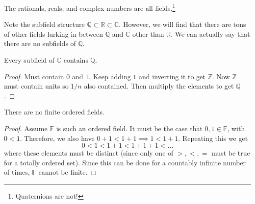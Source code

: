   \begin{example}[Numbers]
    The rationals, reals, and complex numbers are all fields.\footnote{Quaternions are not!}
  \end{example}

  Note the subfield structure $\mathbb{Q} \subset \mathbb{R} \subset \mathbb{C}$. However, we will find that there are tons of other fields lurking in between $\mathbb{Q}$ and $\mathbb{C}$ other than $\mathbb{R}$. We can actually say that there are no subfields of $\mathbb{Q}$. 

  \begin{lemma}
    Every subfield of $\mathbb{C}$ contains $\mathbb{Q}$. 
  \end{lemma}
  \begin{proof}
    Must contain $0$ and $1$. Keep adding $1$ and inverting it to get $\mathbb{Z}$. Now $\mathbb{Z}$ must contain units so $1/n$ also contained. Then multiply the elements to get $\mathbb{Q}$. 
  \end{proof} 

  \begin{theorem}
    There are no finite ordered fields. 
  \end{theorem} 
  \begin{proof}
    Assume $\mathbb{F}$ is such an ordered field. It must be the case that $0, 1 \in \mathbb{F}$, with $0 < 1$. Therefore, we also have $0 + 1 < 1 + 1 \implies 1 < 1 + 1$. Repeating this we get 
    \begin{equation}
      0 < 1 < 1 + 1 < 1 + 1 + 1 < \ldots
    \end{equation}
    where these elements must be distinct (since only one of $>, <, =$ must be true for a totally ordered set). Since this can be done for a countably infinite number of times, $\mathbb{F}$ cannot be finite. 
  \end{proof}


